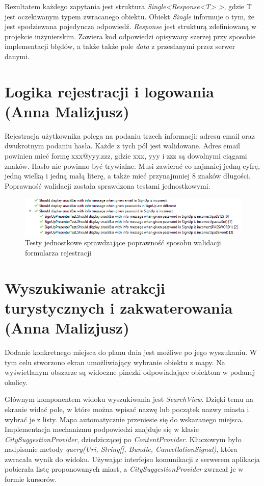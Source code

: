 \documentclass[10pt,twoside,a4paper]{report}
\begin{document}
\par Rezultatem każdego zapytania jest struktura \textit{Single<Response<T> >}, gdzie T jest oczekiwanym typem zwracanego obiektu. Obiekt \textit{Single} informuje o tym, że jest spodziewana pojedyncza odpowiedź. \textit{Response} jest strukturą zdefiniowaną w projekcie inżynierskim. Zawiera kod odpowiedzi opisywany szerzej przy sposobie implementacji błędów, a także także pole \textit{data} z przesłanymi przez serwer danymi.


\section{Logika rejestracji i logowania (Anna Malizjusz)}
\par Rejestracja użytkownika polega na podaniu trzech informacji: adresu email oraz dwukrotnym podaniu hasła. Każde z tych pól jest walidowane. Adres email powinien mieć formę xxx@yyy.zzz, gdzie xxx, yyy i zzz są dowolnymi ciągami znaków. Hasło nie powinno być trywialne. Musi zawierać co najmniej jedną cyfrę, jedną wielką i jedną małą literę, a także mieć przynajmniej 8 znaków długości. Poprawność walidacji została sprawdzona testami jednostkowymi.

\begin{figure}[h]
\centering
\includegraphics[width=\linewidth]{registerUnitTestResult}
\caption{Testy jednostkowe sprawdzające poprawność sposobu walidacji formularza rejestracji}
\label{fig:tokenPayload}
\end{figure}


\section{Wyszukiwanie atrakcji turystycznych i zakwaterowania (Anna Malizjusz)}
\par Dodanie konkretnego miejsca do planu dnia jest możliwe po jego wyszukaniu. W tym celu stworzono ekran umożliwiający wybranie obiektu z mapy. Na wyświetlanym obszarze są widoczne pinezki odpowiadające obiektom w podanej okolicy.

\par Głównym komponentem widoku wyszukiwania jest \textit{SearchView}\cite{SearchView}. Dzięki temu na ekranie widać pole, w które można wpisać nazwę lub początek nazwy miasta i wybrać je z listy. Mapa automatycznie przeniesie się do wskazanego miejsca. Implementacja mechanizmu podpowiedzi znajduje się w klasie \textit{CitySuggestionProvider}, dziedziczącej po \textit{ContentProvider}\cite{ContentProvider}. Kluczowym było nadpisanie metody \textit{query(Uri, String[], Bundle, CancellationSignal)}, która zwracała wynik do widoku. Używając interfejsu komunikacji z serwerem aplikacja pobierała listę proponowanych miast, a \textit{CitySuggestionProvider} zwracał je w formie kursorów.
\end{document}
